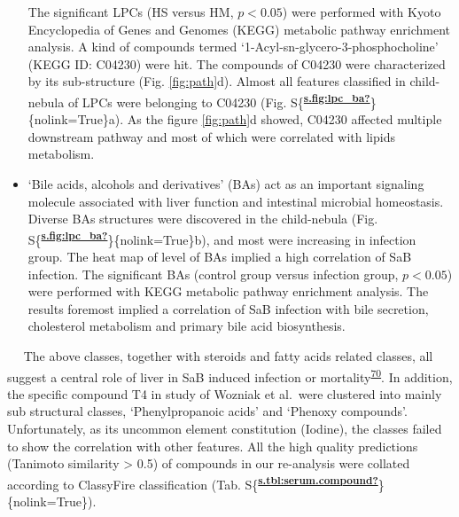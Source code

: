 \begin{itemize}
  The significant LPCs (HS versus HM, \(p \lt 0.05\)) were performed
  with Kyoto Encyclopedia of Genes and Genomes (KEGG) metabolic pathway
  enrichment analysis. A kind of compounds termed
  `1-Acyl-sn-glycero-3-phosphocholine' (KEGG ID: C04230) were hit. The
  compounds of C04230 were characterized by its sub-structure (Fig.
  {\protect\NoHyper\ref{fig:path}\protect\endNoHyper}d). Almost all
  features classified in child-nebula of LPCs were belonging to C04230
  (Fig.
  S\{\textsuperscript{\protect\hyperlink{ref-s.fig:lpc_ba}{\textbf{s.fig:lpc\_ba?}}}\}\{nolink=True\}a).
  As the figure {\protect\NoHyper\ref{fig:path}\protect\endNoHyper}d
  showed, C04230 affected multiple downstream pathway and most of which
  were correlated with lipids metabolism.
\item
  `Bile acids, alcohols and derivatives' (BAs) act as an important
  signaling molecule associated with liver function and intestinal
  microbial homeostasis. Diverse BAs structures were discovered in the
  child-nebula (Fig.
  S\{\textsuperscript{\protect\hyperlink{ref-s.fig:lpc_ba}{\textbf{s.fig:lpc\_ba?}}}\}\{nolink=True\}b),
  and most were increasing in infection group. The heat map of level of
  BAs implied a high correlation of SaB infection. The significant BAs
  (control group versus infection group, \(p \lt 0.05\)) were performed
  with KEGG metabolic pathway enrichment analysis. The results foremost
  implied a correlation of SaB infection with bile secretion,
  cholesterol metabolism and primary bile acid biosynthesis.
\end{itemize}

   The above classes, together with steroids and fatty acids related
classes, all suggest a central role of liver in SaB induced infection or
mortality\textsuperscript{\protect\hyperlink{ref-2017au}{70}}. In
addition, the specific compound T4 in study of Wozniak et al.~were
clustered into mainly sub structural classes, `Phenylpropanoic acids'
and `Phenoxy compounds'. Unfortunately, as its uncommon element
constitution (Iodine), the classes failed to show the correlation with
other features. All the high quality predictions (Tanimoto similarity
\textgreater{} 0.5) of compounds in our re-analysis were collated
according to ClassyFire classification (Tab.
S\{\textsuperscript{\protect\hyperlink{ref-s.tbl:serum.compound}{\textbf{s.tbl:serum.compound?}}}\}\{nolink=True\}).

